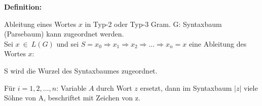 \documentclass[11pt,
			a4paper,
			parskip=full,
			toc=bib,
			toc=idx,
			toc=listof,
			ngerman
			listof=totoc,]{scrartcl}
\newcommand{\concept}[1]{%
	\sf{%
		\textbf{%
				\textcolor{mymauve}{#1}%
		}%
	}%
	\rm%
}
\newenvironment{objDef}[1]%
{	\begin{framed}
	\textbf{Definition:} \concept{#1}
	\compress}%
{\end{framed}}
\newenvironment{cmt}%
{\color{mygray} § }
{\color{black}}
\newenvironment{qtn}%
{\color{yellow} ? }
{\color{black}}
\newenvironment{expl}%
{\color{red}}
{\color{black}}
\newcommand{\compress}{\vspace{-1em}}
\begin{document}




\compress
\begin{objDef}{Syntaxbaum}

Ableitung eines Wortes $x$ in Typ-2 oder Typ-3 Gram. G: Syntaxbaum (Parsebaum) kann zugeordnet werden.\\
Sei $x ~ ∈ ~ L(G)$ und sei $S = x_0 ⇒ x_1 ⇒ x_2 ⇒ ... ⇒ x_n = x$ eine Ableitung des Wortes $x$:
\compress
\begin{compactenum}
\item S wird die Wurzel des Syntaxbaumes zugeordnet.
\item Für $i = 1,2,\dots,n$: Variable $A$ durch Wort $z$ ersetzt, dann im Syntaxbaum $|z|$ viele Söhne von A, beschriftet mit Zeichen von z.
\end{compactenum}
\end{objDef}


\end{document}
